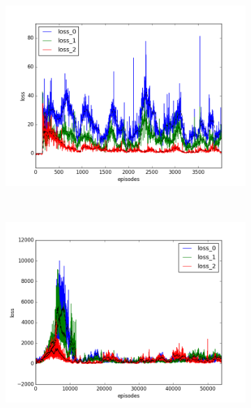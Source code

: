 \begin{figure}[t]
  \vspace{\graphspacing}
  \begin{subfigure}[t]{\figscale\linewidth}
    \hspace*{-2.75cm}
    \includegraphics[width=1.5\textwidth]
    {../results/dqn_2vs1/loss.png}
    \label{fig:dqn-2vs1-loss}
  \end{subfigure}
  ~
  \begin{subfigure}[t]{\figscale\linewidth}
    \hspace*{-1.4cm}
    \includegraphics[width=1.5\textwidth]
    {../results/ddpg_2vs1/loss.png}
    \label{fig:ddpg-2vs1-loss}
  \end{subfigure}
  ~
  \begin{subfigure}[t]{\figscale\linewidth}

\end{subfigure}
\end{figure}
